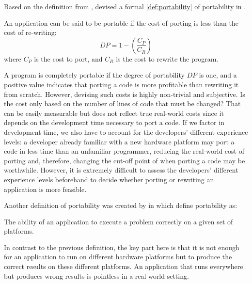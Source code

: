 Based on the definition from \citet{mooney_bringing_1997}, \citet{sedova_high-performance_2018} devised a formal \autoref{def:portability} of portability in \citeyear{sedova_high-performance_2018}.
\begin{definition}\label{def:portability}
An application can be said to be portable if the cost of porting is less than the cost of re-writing:
$$DP = 1 - \left(\frac{C_P}{C_R}\right)$$
where $C_P$ is the cost to port, and $C_R$ is the cost to rewrite the program. 
\end{definition}
A program is completely portable if the degree of portability $DP$ is one, and a positive value indicates that porting a code is more profitable than rewriting it from scratch. 
However, devising such costs is highly non-trivial and subjective. 
Is the cost only based on the number of lines of code that must be changed? 
That can be easily measurable but does not reflect true real-world costs since it depends on the development time necessary to port a code. 
If we factor in development time, we also have to account for the developers' different experience levels: a developer already familiar with a new hardware platform may port a code in less time than an unfamiliar programmer, reducing the real-world cost of porting and, therefore, changing the cut-off point of when porting a code may be worthwhile. 
However, it is extremely difficult to assess the developers' different experience levels beforehand to decide whether porting or rewriting an application is more feasible. 

Another definition of portability was created by \citet{pennycook_metric_2016, pennycook_implications_2019} in \citeyear{pennycook_metric_2016} which define portability as: 
\begin{quotebox}{\citet{pennycook_implications_2019}}
    The ability of an application to execute a problem correctly on a given set of platforms.
\end{quotebox}
In contrast to the previous definition, the key part here is that it is not enough for an application to run on different hardware platforms but to produce the correct results on these different platforms. 
An application that runs everywhere but produces wrong results is pointless in a real-world setting. 


